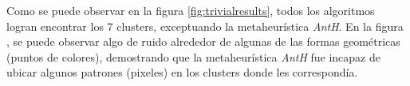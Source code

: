     Como se puede observar en la figura \ref{fig:trivialresults}, todos los
algoritmos logran encontrar los 7 clusters, exceptuando la metaheurística
\emph{AntH}. En la figura , se puede observar algo de
ruido alrededor de algunas de las formas geométricas (puntos de colores),
demostrando que la metaheurística \emph{AntH} fue incapaz de ubicar algunos
patrones (pixeles) en los clusters donde les correspondía.

\begin{figure}[h!]
  \centering
   \qquad
   \qquad

\end{figure}
